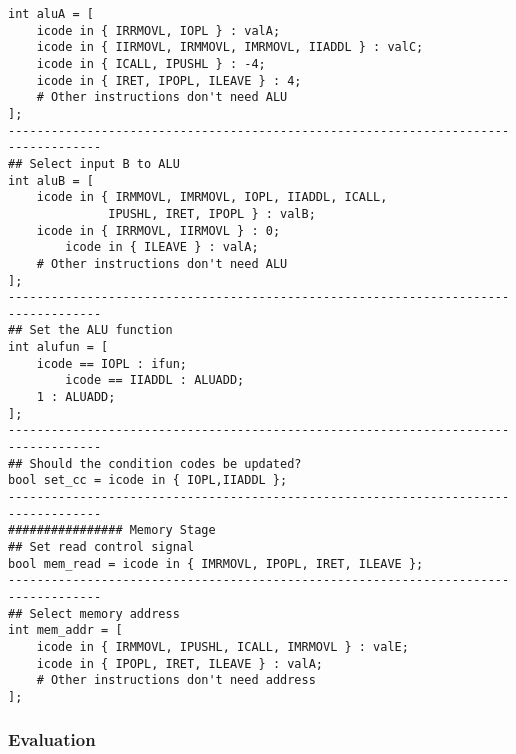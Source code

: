 \documentclass{article}
\begin{document}
\begin{lstlisting}[language={[x86masm]Assembler}]
int aluA = [
	icode in { IRRMOVL, IOPL } : valA;
	icode in { IIRMOVL, IRMMOVL, IMRMOVL, IIADDL } : valC;
	icode in { ICALL, IPUSHL } : -4;
	icode in { IRET, IPOPL, ILEAVE } : 4;
	# Other instructions don't need ALU
];
-----------------------------------------------------------------------------------
## Select input B to ALU
int aluB = [
	icode in { IRMMOVL, IMRMOVL, IOPL, IIADDL, ICALL, 
		      IPUSHL, IRET, IPOPL } : valB;
	icode in { IRRMOVL, IIRMOVL } : 0;
        icode in { ILEAVE } : valA;
	# Other instructions don't need ALU
];
-----------------------------------------------------------------------------------
## Set the ALU function
int alufun = [
	icode == IOPL : ifun;
        icode == IIADDL : ALUADD;
	1 : ALUADD;
];
-----------------------------------------------------------------------------------
## Should the condition codes be updated?
bool set_cc = icode in { IOPL,IIADDL };
-----------------------------------------------------------------------------------
################ Memory Stage
## Set read control signal
bool mem_read = icode in { IMRMOVL, IPOPL, IRET, ILEAVE };
-----------------------------------------------------------------------------------
## Select memory address
int mem_addr = [
	icode in { IRMMOVL, IPUSHL, ICALL, IMRMOVL } : valE;
	icode in { IPOPL, IRET, ILEAVE } : valA;
	# Other instructions don't need address
];
\end{lstlisting}

\subsubsection{Evaluation}
\end{document}
